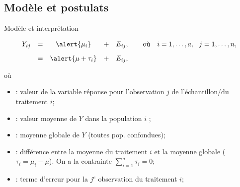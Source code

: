 \documentclass{BeamerTemplate}
\begin{document}
\subsection[Modèle]{Modèle et postulats}

\begin{frame}[t]{Modèle et interprétation}

{\small
$$\begin{array}{lcccl}
Y_{ij} & = & \alert{\mu_i} &+& E_{ij},\qquad\textrm{où}~~~i=1, \ldots, a,~~j=1, \ldots, n,
\\[0.3cm]
 & = & \alert{\mu + \tau_i} &+& E_{ij},%
\end{array}$$

où
\begin{itemize}
\item<1->[$Y_{ij}$]:  valeur de la variable réponse pour l'observation $j$ de l'échantillon/du traitement $i$;
\item<2->[$\mu_i$]:  valeur moyenne de $Y$ dans la population $i$ ;
\item<3->[$\mu$]:  moyenne  globale de $Y$ (toutes pop. confondues);
\item<4->[$\tau_i$]:  différence entre la moyenne du traitement $i$ et la moyenne globale ($\tau_i=\mu_i-\mu$). %
    On a la contrainte $\sum_{i=1}^a\tau_i=0$;
\item<5->[$E_{ij}$]:  terme d'erreur pour la $j^e$ observation du traitement $i$;
\end{itemize}
}

\end{frame}
\end{document}

